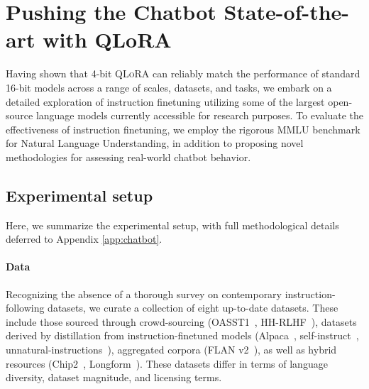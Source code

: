 \section{Pushing the Chatbot State-of-the-art with QLoRA}
\label{sec:pushing}
Having shown that 4-bit \textsc{QLoRA} can reliably match the performance of standard 16-bit models across a range of scales, datasets, and tasks, we embark on a detailed exploration of instruction finetuning utilizing some of the largest open-source language models currently accessible for research purposes. To evaluate the effectiveness of instruction finetuning, we employ the rigorous MMLU benchmark for Natural Language Understanding, in addition to proposing novel methodologies for assessing real-world chatbot behavior.

\subsection{Experimental setup} Here, we summarize the experimental setup, with full methodological details deferred to Appendix \ref{app:chatbot}.

\paragraph{Data} Recognizing the absence of a thorough survey on contemporary instruction-following datasets, we curate a collection of eight up-to-date datasets. These include those sourced through crowd-sourcing (OASST1~\citep{kopf2023openassistant}, HH-RLHF~\citep{bai2022training}), datasets derived by distillation from instruction-finetuned models (Alpaca~\citep{alpaca}, self-instruct~\citep{wang2022self}, unnatural-instructions~\citep{honovich2022unnatural}), aggregated corpora (FLAN v2~\citep{chung2022scaling}), as well as hybrid resources (Chip2~\citep{laion2023}, Longform~\citep{koksal2023longform}). These datasets differ in terms of language diversity, dataset magnitude, and licensing terms.

